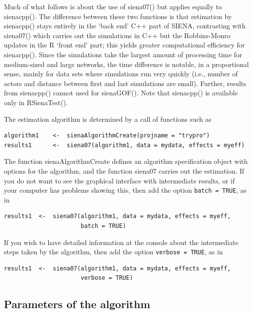 \documentclass[a4paper,fleqn,11pt]{article}
\newcommand{\+}{\, + \,}
\newcommand{\sfn}[1]{\textsf{#1}}
\newcommand{\si}{{\sf SIENA}}
\begin{document}
Much of what follows is about the use of \sfn{siena07()}
but applies equally to \sfn{sienacpp()}.
The difference between these two functions is that
estimation by \sfn{sienacpp()} stays entirely in the
`back end' \sfn{C++} part of \si, contrasting with \sfn{siena07()}
which carries out the simulations in \sfn{C++} but the
Robbins-Monro updates in the \sfn{R} `front end' part;
this yields greater computational efficiency for \sfn{sienacpp()}.
Since the simulations take the largest amount of processing time
for medium-sized and large networks, the time difference is
notable, in a proportional sense, mainly for data sets
where simulations run very quickly (i.e., number of actors
and distance between first and last simulations are small).
Further, results from \sfn{sienacpp()} cannot used for
\sfn{sienaGOF()}.
Note that \sfn{sienacpp()} is available only in \sfn{RSienaTest()}.

The estimation algorithm is determined by a call of functions
such as
\begin{verbatim}
algorithm1    <-  sienaAlgorithmCreate(projname = "trypro")
results1      <-  siena07(algorithm1, data = mydata, effects = myeff)
\end{verbatim}
The function \textsf{sienaAlgorithmCreate} defines an algorithm specification
object with options for the algorithm, and the function  \textsf{siena07}
carries out the estimation.
If you do not want to see the graphical interface with intermediate
results, or if your computer has problems showing this, then add
the option \texttt{batch = TRUE}, as in
\begin{verbatim}
results1  <-  siena07(algorithm1, data = mydata, effects = myeff,
                      batch = TRUE)
\end{verbatim}
If you wish to have detailed information at the console about the intermediate
steps taken by the algorithm, then add
the option \texttt{verbose = TRUE}, as in
\begin{verbatim}
results1  <-  siena07(algorithm1, data = mydata, effects = myeff,
                      verbose = TRUE)
\end{verbatim}

\subsection{Parameters of the algorithm}
\label{S_param}
\end{document}
